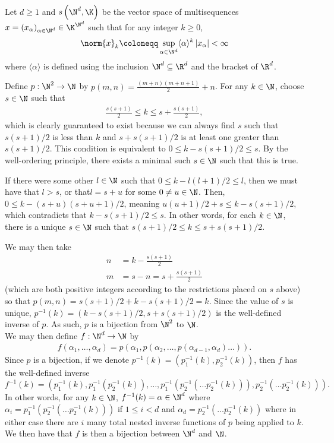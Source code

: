 \documentclass[10pt]{mypackage}
\renewcommand{\coloneq}{\coloneqq}
\newcommand{\brak}[1]{\langle #1 \rangle}
\begin{document}
\begin{solution}
Let $d \geq 1$ and $s\left(\N^d,\K\right)$ be the vector space of multisequences $x = \left(x_\alpha\right)_{\alpha\in\N^d}\in\K^{\N^d}$ such that for any integer $k\geq 0$,
\begin{align*}
 \norm{x}_k \coloneq \sup_{\alpha\in\N^d}\brak{\alpha}^k\left\vert x_\alpha \right\vert < \infty 
\end{align*}
where $\brak{\alpha}$ is defined using the inclusion $\N^d\subseteq \R^d$ and the bracket of $\R^d$.

Define $p:\N^2\to\N$ by $p(m,n) = \frac{(m+n)(m+n+1)}{2}+n$. For any $k\in\N$, choose $s\in \N$ such that 
\begin{align*}
   \frac{s(s+1)}{2} \leq k \leq s+\frac{s(s+1)}{2},
\end{align*}
which is clearly guaranteed to exist because we can always find $s$ such that $s(s+1)/2$ is less than $k$ and $s+s(s+1)/2$ is at least one greater than $s(s+1)/2$. This condition is equivalent to $0 \leq k - s(s+1)/2 \leq s$. By the well-ordering principle, there exists a minimal such $s\in\N$ such that this is true. 

If there were some other $l\in\N$ such that $0 \leq k - l(l+1)/2 \leq l$, then we must have that $l > s $, or that$ l = s + u$ for some $0\neq u\in \N$. Then, $0 \leq k - (s+u)(s+u+1)/2 $, meaning $ u(u+1)/2 + s \leq k - s(s+1)/2$, which contradicts that $k - s(s+1)/2 \leq s$. In other words, for each $k\in\N$, there is a unique $s\in\N$ such that $s(s+1)/2 \leq k \leq s+s(s+1)/2$.

We may then take 
\begin{align*}
  n &= k - \frac{s(s+1)}{2}\\
  m &= s - n = s+\frac{s(s+1)}{2} 
\end{align*}
(which are both positive integers according to the restrictions placed on $s$ above) so that $p(m,n) = s(s+1)/2 + k - s(s+1)/2 = k$. Since the value of $s$ is unique, $p^{-1}(k) = (k-s(s+1)/2, s+s(s+1)/2)$ is the well-defined inverse of $p$. As such, $p$ is a bijection from $\N^2$ to $\N$.\\

We may then define $f:\N^d\to\N$ by 
\begin{align*}
 f(\alpha_1,\ldots,\alpha_d) = p(\alpha_1,p(\alpha_2,\ldots,p(\alpha_{d-1},\alpha_d)\ldots)). 
\end{align*}
Since $p$ is a bijection, if we denote $p^{-1}(k) = (p^{-1}_1(k), p^{-1}_2(k))$, then $f$ has the well-defined inverse
\[
f^{-1}(k) = (p^{-1}_1(k), p^{-1}_1(p^{-1}_2(k)),\ldots,p^{-1}_1(p^{-1}_2(\ldots p^{-1}_2(k))), p^{-1}_2(\ldots p^{-1}_2(k))).
\]
In other words, for any $k\in\N$, $f^{-1}(k) = \alpha \in \N^d$ where $\alpha_i = p^{-1}_1(p^{-1}_2(\ldots p^{-1}_2(k)))$ if $1\leq i < d$ and $\alpha_d = p^{-1}_2(\ldots p^{-1}_2(k))$ where in either case there are $i$ many total nested inverse functions of $p$ being applied to $k$. We then have that $f$ is then a bijection between $\N^d$ and $\N$.


\end{solution}
\end{document}
